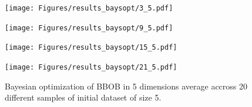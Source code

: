 \begin{figure}[H]
  \centering
  \begin{minipage}[b]{0.49\textwidth}
   \texttt{[image: Figures/results\_baysopt/3\_5.pdf]}
  \end{minipage}
  \hfill
  \begin{minipage}[b]{0.49\textwidth}
    \texttt{[image: Figures/results\_baysopt/9\_5.pdf]}
   \end{minipage}
   \begin{minipage}[b]{0.49\textwidth}
    \texttt{[image: Figures/results\_baysopt/15\_5.pdf]}
   \end{minipage}
   \hfill
   \begin{minipage}[b]{0.49\textwidth}
     \texttt{[image: Figures/results\_baysopt/21\_5.pdf]}
    \end{minipage}
  \caption{Bayesian optimization of BBOB in 5 dimensions average accross 20 different samples of initial dataset of size 5.}
  \label{BBOB_bayesOpt5}
\end{figure}


